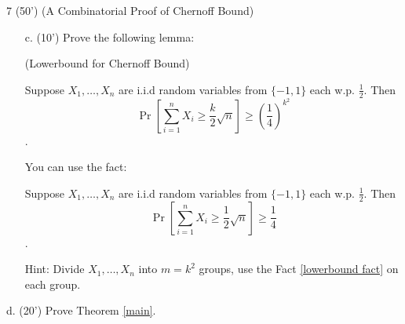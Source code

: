 \begin{question}{7 (50') (A Combinatorial Proof of Chernoff Bound)}
\begin{itemize}
\begin{lemma}
  Suppose $X_1, \dots, X_n$ are i.i.d random variables, that $X_i \ge 0, \Pr[X_i \ge j] \le p^ j, \forall j = 1, 2, \dots$ for a $p < \frac 14$. Then 
  
  $$\Pr[\sum_{i =1 } ^ n X_i \ge 2n] \le (4p) ^ {-n}$$.
        \end{lemma}

        Hint: If we can prove $\Pr[\sum_{i = 1} ^ n \lfloor X_i \rfloor \ge n] \le (4p) ^ {-n}$, then it's easy to see the lemma will hold. Suppose $\sum_{i = 1} ^ n  \lfloor X_i \rfloor  \ge n$, then there exist $Y_1, \dots, Y_n$, that $\forall 1\le i\le n, X_i \ge Y_i$ and $\sum_{i = 1} ^ n Y_i = n$. 

        Fix the sequence $Y_1, \dots, Y_n$, calculate the probability of sequence $X_i$ satisfies $\forall i, X_i \ge Y_i$. Then use union bound for all the posible sequence of $Y$.


        \item[c. (10')]  Prove the following lemma: 
        \begin{lemma} (Lowerbound for Chernoff Bound)
    
    Suppose $X_1, \dots, X_n$ are i.i.d random variables from $\{-1, 1\}$ each w.p. $\frac 12$. Then 
    $$\Pr[\sum_{i = 1} ^ n X_i \ge \frac k2\sqrt{n}] \ge (\frac 14) ^ {k^ 2}$$.

\end{lemma}

You can use the fact: 

\begin{fact}\label{lowerbound fact}
        Suppose $X_1, \dots, X_n$ are i.i.d random variables from $\{-1, 1\}$ each w.p. $\frac 12$. Then 
    $$\Pr[\sum_{i = 1} ^ n X_i \ge \frac 12\sqrt{n}] \ge \frac 14$$.

\end{fact}

Hint: Divide $X_1, \dots, X_n$ into $m = k^ 2$ groups, use the Fact \ref{lowerbound fact} on each group. 
    \end{itemize}

    \item [d. (20')] Prove Theorem \ref{main}. 
    \end{question}  